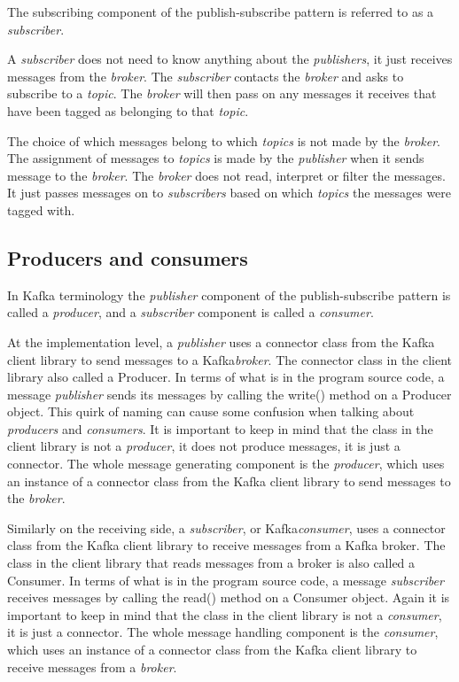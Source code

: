 \documentclass{article}
\newcommand{\kafka} {Kafka\xspace}
\newcommand{\kftopic} {\textit{topic}\xspace}
\newcommand{\kftopics} {\textit{topics}\xspace}
\newcommand{\kfbroker} {\textit{broker}\xspace}
\newcommand{\kfconsumer} {\textit{consumer}\xspace}
\newcommand{\kfconsumers} {\textit{consumers}\xspace}
\newcommand{\kfproducer} {\textit{producer}\xspace}
\newcommand{\kfproducers} {\textit{producers}\xspace}
\newcommand{\kfpublisher} {\textit{publisher}\xspace}
\newcommand{\kfpublishers} {\textit{publishers}\xspace}
\newcommand{\kfsubscriber} {\textit{subscriber}\xspace}
\newcommand{\kfsubscribers} {\textit{subscribers}\xspace}
\newcommand{\javaname}[1] {{\ttfamily\color{codeblue} #1}}
\begin{document}
The subscribing component of the publish-subscribe pattern is referred to as a \kfsubscriber.

A \kfsubscriber does not need to know anything about the \kfpublishers, it just receives messages from the \kfbroker. 
The \kfsubscriber contacts the \kfbroker and asks to subscribe to a \kftopic. The \kfbroker will then pass on any messages it receives that have been tagged as belonging to that \kftopic.

The choice of which messages belong to which \kftopics is not made by the \kfbroker. The assignment of messages to \kftopics is made by the \kfpublisher when it sends message to the \kfbroker.
The \kfbroker does not read, interpret or filter the messages. It just passes messages on to \kfsubscribers based on which \kftopics the messages were tagged with. 

\subsection{Producers and consumers}
\label{kafka-producer-consumer}

In \kafka terminology the \kfpublisher component of the publish-subscribe pattern is called a \kfproducer, and a \kfsubscriber component is called a \kfconsumer.

At the implementation level, a \kfpublisher uses a connector class from the \kafka client library to send messages to a \kafka \kfbroker.
The connector class in the client library also called a \javaname{Producer}.
In terms of what is in the program source code, a message \kfpublisher sends its messages by calling the \javaname{write()} method on a \javaname{Producer} object.
This quirk of naming can cause some confusion when talking about \kfproducers and \kfconsumers.
It is important to keep in mind that the class in the client library is not a \kfproducer, it does not produce messages, it is just a connector. The whole message generating component is the \kfproducer, which uses an instance of a connector \javaname{class} from the \kafka client library to send messages to the \kfbroker.

Similarly on the receiving side, a \kfsubscriber, or \kafka \kfconsumer, uses a connector class from the \kafka client library to receive messages from a \kafka broker.
The class in the client library that reads messages from a broker is also called a \javaname{Consumer}. In terms of what is in the program source code, a message \kfsubscriber receives messages by calling the \javaname{read()} method on a \javaname{Consumer} object.
Again it is important to keep in mind that the class in the client library is not a \kfconsumer, it is just a connector. The whole message handling component is the \kfconsumer, which uses an instance of a connector \javaname{class} from the \kafka client library to receive messages from a \kfbroker.
\end{document}
